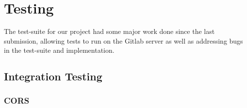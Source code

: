 \section{Testing}
The test-suite for our project had some major work done since the last submission, allowing tests to run on the Gitlab server as well as addressing bugs in the test-suite and implementation. 
\subsection{Integration Testing}
\subsubsection{CORS}